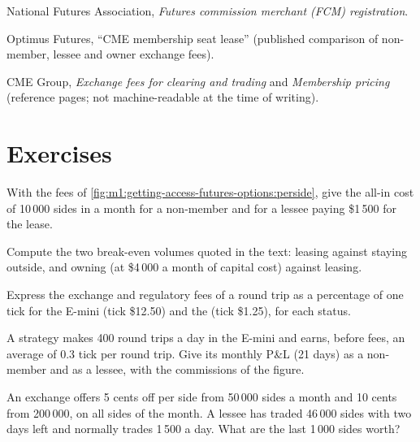 \begin{omsources}
\item National Futures Association, \emph{Futures commission merchant (FCM)
registration}.
\item Optimus Futures, ``CME membership seat lease'' (published comparison of
non-member, lessee and owner exchange fees).
\item CME Group, \emph{Exchange fees for clearing and trading} and
\emph{Membership pricing} (reference pages; not machine-readable at the time
of writing).
\end{omsources}

\section{Exercises}

\begin{exercise}[$\star$]\label{exo:m1:getting-access-futures-options:1}
With the fees of \cref{fig:m1:getting-access-futures-options:perside}, give
the all-in cost of 10\,000 sides in a month for a non-member and for a lessee
paying \$1\,500 for the lease.
\end{exercise}

\begin{exercise}[$\star$]\label{exo:m1:getting-access-futures-options:2}
Compute the two break-even volumes quoted in the text: leasing against
staying outside, and owning (at \$4\,000 a month of capital cost) against
leasing.
\end{exercise}

\begin{exercise}[$\star$]\label{exo:m1:getting-access-futures-options:3}
Express the exchange and regulatory fees of a round trip as a percentage of
one tick for the E-mini (tick \$12.50) and the  (tick \$1.25), for
each status.
\end{exercise}

\begin{exercise}[$\star\star$]\label{exo:m1:getting-access-futures-options:4}
A strategy makes 400 round trips a day in the E-mini and earns, before fees,
an average of 0.3 tick per round trip. Give its monthly P\&L (21 days) as a
non-member and as a lessee, with the commissions of the figure.
\end{exercise}

\begin{exercise}[$\star\star$]\label{exo:m1:getting-access-futures-options:5}
An exchange offers 5 cents off per side from 50\,000 sides a month and 10
cents from 200\,000, on all sides of the month. A lessee has traded 46\,000
sides with two days left and normally trades 1\,500 a day. What are the last
1\,000 sides worth?
\end{exercise}

